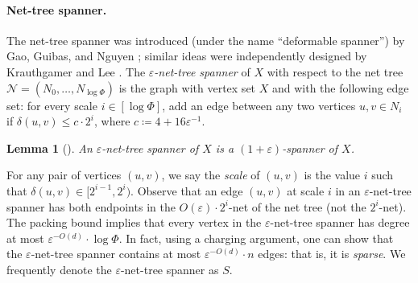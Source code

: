 \documentclass[11pt]{article}
\let\e\varepsilon               %
\def\EMPH#1{\emph{\textcolor{BrickRed} {#1}}}
\newtheorem{lemma}[theorem]{Lemma}
\newcommand{\dist}{\ensuremath{\delta}}
\newcommand{\ddim}{\ensuremath{d}}
\begin{document}
\paragraph{Net-tree spanner.}
The net-tree spanner was introduced (under the name ``deformable spanner'') by Gao, Guibas, and Nguyen \cite{gao2004deformable}; similar ideas were independently designed by Krauthgamer and Lee \cite{KL04}.  The \EMPH{$\e$-net-tree spanner} of $X$ with respect to the net tree $\mathcal{N} = (N_0, \ldots, N_{\log \Phi})$ is the graph with vertex set $X$ and with the following edge set: for every scale $i \in [\log \Phi]$, add an edge between any two vertices $u, v \in N_i$ if $\dist(u, v) \le c \cdot 2^i$, where $c \coloneqq 4 + 16 \e^{-1}$.
\begin{lemma}[{\cite[Theorem 3.2]{gao2004deformable}}]
\label{lem:net-spanner}
    An $\e$-net-tree spanner of $X$ is a $(1+\e)$-spanner of $X$.
\end{lemma}
For any pair of vertices $(u, v)$, we say the \EMPH{scale} of $(u, v)$ is the value $i$ such that $\dist(u, v) \in [2^{i-1}, 2^i)$. Observe that an edge $(u,v)$ at scale $i$ in an $\e$-net-tree spanner has both endpoints in the $O(\e) \cdot 2^i$-net of the net tree
(not the $2^i$-net). The packing bound implies that every vertex in the $\e$-net-tree spanner has degree at most $\e^{-O(\ddim)} \cdot \log \Phi$.
In fact, using a charging argument,
one can show that the $\e$-net-tree spanner contains at most $\e^{-O(\ddim)} \cdot n$ edges: that is, it is \emph{sparse}.
We frequently denote the $\e$-net-tree spanner as \EMPH{$S$}.
%
%
\end{document}
